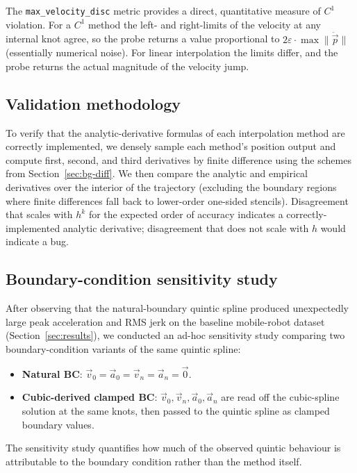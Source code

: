 The \texttt{max\_velocity\_disc} metric provides a direct,
quantitative measure of $C^1$ violation. For a $C^1$ method the
left- and right-limits of the velocity at any internal knot agree,
so the probe returns a value proportional to $2\varepsilon \cdot
\max\|\ddot{\vec{p}}\|$ (essentially numerical noise). For linear
interpolation the limits differ, and the probe returns the actual
magnitude of the velocity jump.

\subsection{Validation methodology}
\label{sec:validation-method}

To verify that the analytic-derivative formulas of each
interpolation method are correctly implemented, we densely sample
each method's position output and compute first, second, and third
derivatives by finite difference using the schemes from
Section~\ref{sec:bg-diff}. We then compare the analytic and empirical
derivatives over the interior of the trajectory (excluding the
boundary regions where finite differences fall back to lower-order
one-sided stencils). Disagreement that scales with $h^k$ for the
expected order of accuracy indicates a correctly-implemented analytic
derivative; disagreement that does not scale with $h$ would indicate
a bug.

\subsection{Boundary-condition sensitivity study}
\label{sec:bc-sensitivity-method}

After observing that the natural-boundary quintic spline produced
unexpectedly large peak acceleration and RMS jerk on the baseline
mobile-robot dataset (Section~\ref{sec:results}), we conducted an
ad-hoc sensitivity study comparing two boundary-condition variants
of the same quintic spline:

\begin{itemize}[leftmargin=*]
\item \textbf{Natural BC}: $\vec{v}_0 = \vec{a}_0 = \vec{v}_n = \vec{a}_n = \vec{0}$.
\item \textbf{Cubic-derived clamped BC}: $\vec{v}_0, \vec{v}_n, \vec{a}_0, \vec{a}_n$
      are read off the cubic-spline solution at the same knots, then
      passed to the quintic spline as clamped boundary values.
\end{itemize}

The sensitivity study quantifies how much of the observed quintic
behaviour is attributable to the boundary condition rather than the
method itself.
